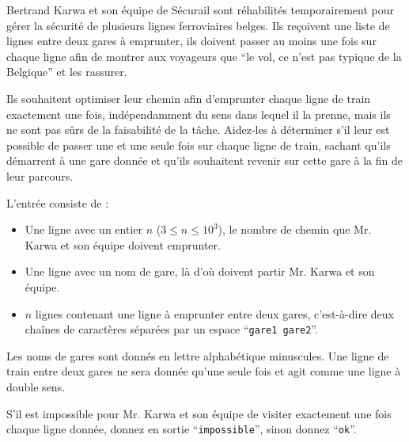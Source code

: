 \problemname{\problemyamlname}

Bertrand Karwa et son équipe de Sécurail sont réhabilités temporairement pour gérer la sécurité de plusieurs
lignes ferroviaires belges. Ils reçoivent une liste de lignes entre deux gares à emprunter, ils doivent passer au moins
une fois sur chaque ligne afin de montrer aux voyageurs que ``le vol, ce n'est pas typique de la Belgique'' et les rassurer.

Ils souhaitent optimiser leur chemin afin d'emprunter chaque ligne de train exactement une fois, indépendamment du sens dans lequel il la prenne, mais ils ne sont pas sûrs
de la faisabilité de la tâche. Aidez-les à déterminer s'il leur est possible de passer une et une seule fois sur chaque ligne de train, sachant qu'ils démarrent à une
gare donnée et qu'ils souhaitent revenir sur cette gare à la fin de leur parcours.

\begin{Input}
	L'entrée consiste de :
	\begin{itemize}
		\item Une ligne avec un entier $n$ ($3 \le n \le 10^3$), le nombre de chemin que Mr. Karwa et son équipe doivent emprunter.
		\item Une ligne avec un nom de gare, là d'où doivent partir Mr. Karwa et son équipe.
		\item $n$ lignes contenant une ligne à emprunter entre deux gares, c'est-à-dire deux chaînes de caractères séparées par un espace ``\verb|gare1 gare2|''.
	\end{itemize}
	Les noms de gares sont donnés en lettre alphabétique minuscules.
	Une ligne de train entre deux gares ne sera donnée qu'une seule fois et agit comme une ligne à double sens.
\end{Input}

\begin{Output}
	S'il est impossible pour Mr. Karwa et son équipe de visiter exactement une fois chaque ligne donnée, donnez en sortie ``\verb|impossible|'', sinon donnez ``\verb|ok|''.
\end{Output}
